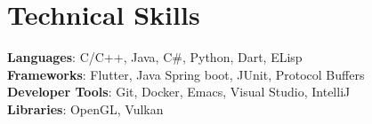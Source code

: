 \documentclass[letterpaper,12pt]{article}
\begin{document}
%
\section{Technical Skills}
 \begin{itemize}[leftmargin=0.15in, label={}]
    \small{\item{
     \textbf{Languages}{: C/C++, Java, C\#, Python, Dart, ELisp} \\
     \textbf{Frameworks}{: Flutter, Java Spring boot, JUnit, Protocol Buffers} \\
     \textbf{Developer Tools}{: Git, Docker, Emacs, Visual Studio, IntelliJ} \\
     \textbf{Libraries}{: OpenGL, Vulkan}
    }}
 \end{itemize}


\end{document}
